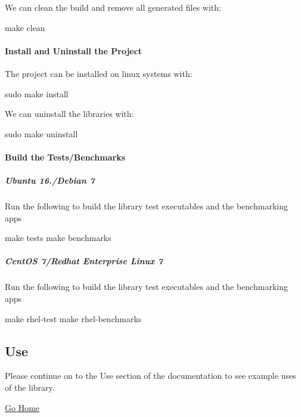 We can clean the build and remove all generated files with\+: \begin{DoxyVerb}make clean
\end{DoxyVerb}


\paragraph*{Install and Uninstall the Project}

The project can be installed on linux systems with\+: \begin{DoxyVerb}sudo make install
\end{DoxyVerb}


We can uninstall the libraries with\+: \begin{DoxyVerb}sudo make uninstall
\end{DoxyVerb}


\paragraph*{Build the Tests/\+Benchmarks}

\subparagraph*{Ubuntu 16./\+Debian 7}

Run the following to build the library test executables and the benchmarking apps \begin{DoxyVerb}make tests
make benchmarks
\end{DoxyVerb}


\subparagraph*{Cent\+OS 7/\+Redhat Enterprise Linux 7}

Run the following to build the library test executables and the benchmarking apps \begin{DoxyVerb}make rhel-test
make rhel-benchmarks
\end{DoxyVerb}


\subsection*{Use}

Please continue on to the Use section of the documentation to see example uses of the library.

\hyperlink{index}{Go Home} 